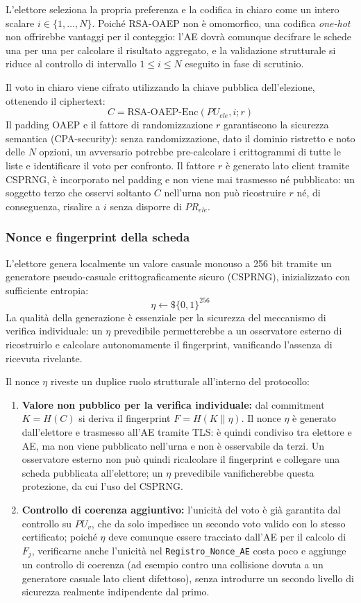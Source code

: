 L'elettore seleziona la propria preferenza e la codifica in chiaro come un intero scalare $i \in \{1, \dots, N\}$. Poiché RSA-OAEP non è omomorfico, una codifica \textit{one-hot} non offrirebbe vantaggi per il conteggio: l'AE dovrà comunque decifrare le schede una per una per calcolare il risultato aggregato, e la validazione strutturale si riduce al controllo di intervallo $1 \le i \le N$ eseguito in fase di scrutinio. 

Il voto in chiaro viene cifrato utilizzando la chiave pubblica dell'elezione, ottenendo il ciphertext:
$$C = \text{RSA-OAEP-Enc}(PU_{ele}, i; r)$$
Il padding OAEP e il fattore di randomizzazione $r$ garantiscono la sicurezza semantica (CPA-security): senza randomizzazione, dato il dominio ristretto e noto delle $N$ opzioni, un avversario potrebbe pre-calcolare i crittogrammi di tutte le liste e identificare il voto per confronto. Il fattore $r$ è generato lato client tramite CSPRNG, è incorporato nel padding e non viene mai trasmesso né pubblicato: un soggetto terzo che osservi soltanto $C$ nell'urna non può ricostruire $r$ né, di conseguenza, risalire a $i$ senza disporre di $PR_{ele}$.

\subsubsection{Nonce e fingerprint della scheda}
\label{subsubsec:wp2_nonce_fingerprint}

L'elettore genera localmente un valore casuale monouso a 256 bit tramite un generatore pseudo-casuale crittograficamente sicuro (CSPRNG), inizializzato con sufficiente entropia:
$$\eta \leftarrow\$ \{0,1\}^{256}$$
La qualità della generazione è essenziale per la sicurezza del meccanismo di verifica individuale: un $\eta$ prevedibile permetterebbe a un osservatore esterno di ricostruirlo e calcolare autonomamente il fingerprint, vanificando l'assenza di ricevuta rivelante.

Il nonce $\eta$ riveste un duplice ruolo strutturale all'interno del protocollo:
\begin{enumerate}
    \item \textbf{Valore non pubblico per la verifica individuale:} dal commitment $K = H(C)$ si deriva il fingerprint $F = H(K \parallel \eta)$. Il nonce $\eta$ è generato dall'elettore e trasmesso all'AE tramite TLS: è quindi condiviso tra elettore e AE, ma non viene pubblicato nell'urna e non è osservabile da terzi. Un osservatore esterno non può quindi ricalcolare il fingerprint e collegare una scheda pubblicata all'elettore; un $\eta$ prevedibile vanificherebbe questa protezione, da cui l'uso del CSPRNG.
    \item \textbf{Controllo di coerenza aggiuntivo:} l'unicità del voto è già garantita dal controllo su $PU_v$, che da solo impedisce un secondo voto valido con lo stesso certificato; poiché $\eta$ deve comunque essere tracciato dall'AE per il calcolo di $F_j$, verificarne anche l'unicità nel \texttt{Registro\_Nonce\_AE} costa poco e aggiunge un controllo di coerenza (ad esempio contro una collisione dovuta a un generatore casuale lato client difettoso), senza introdurre un secondo livello di sicurezza realmente indipendente dal primo.
\end{enumerate}


